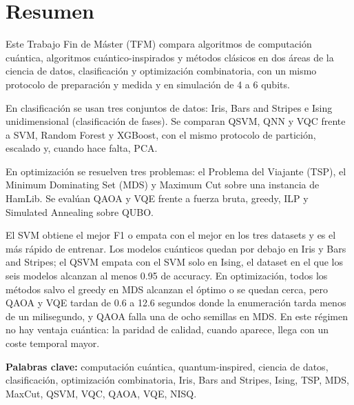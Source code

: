 \chapter{Resumen}

Este Trabajo Fin de Máster (TFM) compara algoritmos de computación cuántica, algoritmos cuántico-inspirados y métodos clásicos en dos áreas de la ciencia de datos, clasificación y optimización combinatoria, con un mismo protocolo de preparación y medida y en simulación de 4 a 6 qubits.

En clasificación se usan tres conjuntos de datos: Iris, Bars and Stripes e Ising unidimensional (clasificación de fases). Se comparan QSVM, QNN y VQC frente a SVM, Random Forest y XGBoost, con el mismo protocolo de partición, escalado y, cuando hace falta, PCA.

En optimización se resuelven tres problemas: el Problema del Viajante (TSP), el Minimum Dominating Set (MDS) y Maximum Cut sobre una instancia de HamLib. Se evalúan QAOA y VQE frente a fuerza bruta, greedy, ILP y Simulated Annealing sobre QUBO.

El SVM obtiene el mejor F1 o empata con el mejor en los tres datasets y es el más rápido de entrenar. Los modelos cuánticos quedan por debajo en Iris y Bars and Stripes; el QSVM empata con el SVM solo en Ising, el dataset en el que los seis modelos alcanzan al menos 0.95 de accuracy. En optimización, todos los métodos salvo el greedy en MDS alcanzan el óptimo o se quedan cerca, pero QAOA y VQE tardan de 0.6 a 12.6 segundos donde la enumeración tarda menos de un milisegundo, y QAOA falla una de ocho semillas en MDS. En este régimen no hay ventaja cuántica: la paridad de calidad, cuando aparece, llega con un coste temporal mayor.

\vspace{0.5em}
\noindent\textbf{Palabras clave:} computación cuántica, quantum-inspired, ciencia de datos, clasificación, optimización combinatoria, Iris, Bars and Stripes, Ising, TSP, MDS, MaxCut, QSVM, VQC, QAOA, VQE, NISQ.

